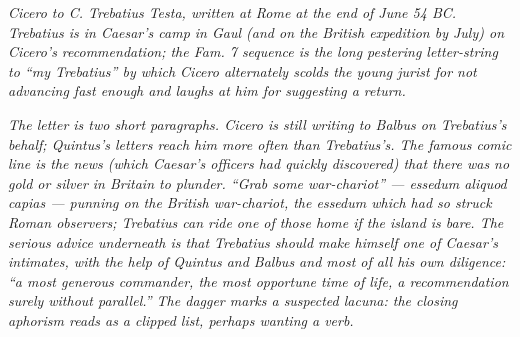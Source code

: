 
\textit{Cicero to C. Trebatius Testa, written at Rome at the end
of June 54 BC. Trebatius is in Caesar's camp in Gaul (and on the
British expedition by July) on Cicero's recommendation; the
\textit{Fam.} 7 sequence is the long pestering letter-string to
``my Trebatius'' by which Cicero alternately scolds the young
jurist for not advancing fast enough and laughs at him for
suggesting a return.}

\textit{The letter is two short paragraphs. Cicero is still
writing to Balbus on Trebatius's behalf; Quintus's letters reach
him more often than Trebatius's. The famous comic line is the
news (which Caesar's officers had quickly discovered) that there
was no gold or silver in Britain to plunder. ``Grab some
war-chariot'' --- \textit{essedum aliquod capias} --- punning on
the British war-chariot, the \textit{essedum} which had so
struck Roman observers; Trebatius can ride one of those home if
the island is bare. The serious advice underneath is that
Trebatius should make himself one of Caesar's intimates, with
the help of Quintus and Balbus and most of all his own diligence:
``a most generous commander, the most opportune time of life, a
recommendation surely without parallel.'' The dagger marks a
suspected lacuna: the closing aphorism reads as a clipped list,
perhaps wanting a verb.}
